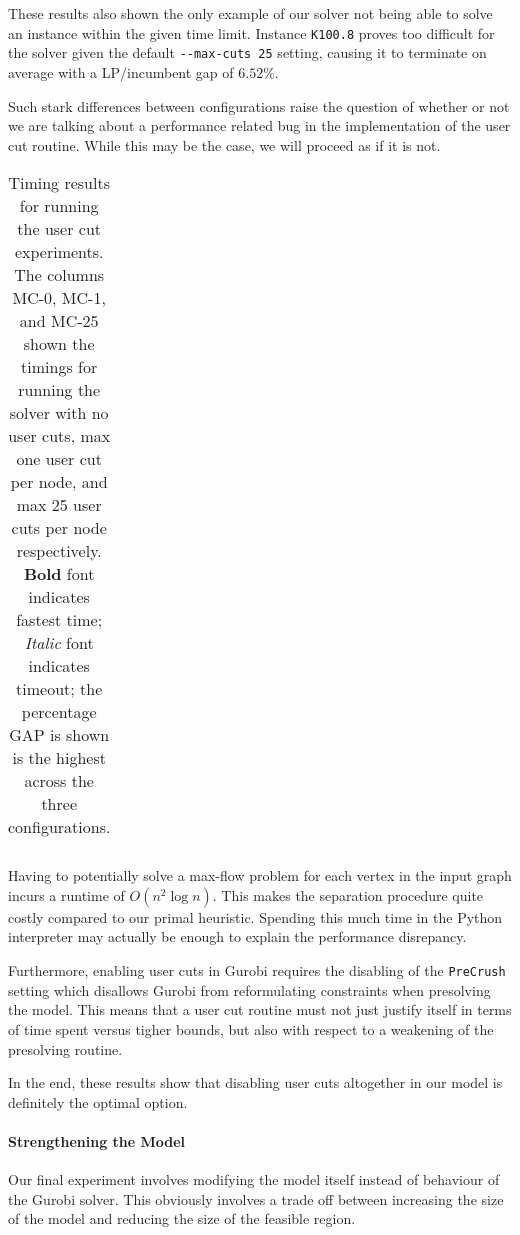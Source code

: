 These results also shown the only example of our solver not being able to solve an instance
within the given time limit. Instance \texttt{K100.8} proves too difficult for the solver
given the default \texttt{-{}-max-cuts 25} setting, causing it to terminate on average with
a LP/incumbent gap of $6.52\%$.

Such stark differences between configurations
raise the question of whether or not we are talking about a performance
related bug in the implementation of the user cut routine.
While this may be the case, we will proceed as if it is not.

\begin{table}[h!]
  \centering
  \begin{tabular}[h!]{|c|c|c|c|c|c|}\hline
    
  \end{tabular}
  \caption{Timing results for running the user cut experiments. The columns MC-0,
    MC-1, and MC-25 shown the timings for running the solver with no user cuts, max
    one user cut per node, and max 25 user cuts per node respectively.
    \textbf{Bold} font indicates fastest time; \textit{Italic} font indicates
    timeout; the percentage GAP is shown is the highest across the three configurations.}\label{tab:jmp:maxcut}
\end{table}

Having to potentially solve a max-flow problem for each vertex in the input graph incurs a runtime
of $O(n^2 \log n)$. This makes the separation procedure quite costly compared
to our primal heuristic.
Spending this much time in the Python interpreter may actually be enough to explain the performance
disrepancy.

Furthermore, enabling user cuts in Gurobi requires the disabling of the \texttt{PreCrush} setting
which disallows Gurobi from reformulating constraints when presolving the model. This means
that a user cut routine must not just justify itself in terms of time spent versus tigher bounds,
but also with respect to a weakening of the presolving routine.

In the end, these results show that disabling user cuts altogether in our model is definitely
the optimal option.

\paragraph{Strengthening the Model}
Our final experiment involves modifying the model itself instead of behaviour of the Gurobi solver.
This obviously involves a trade off between increasing the size of the model and reducing the size
of the feasible region.

